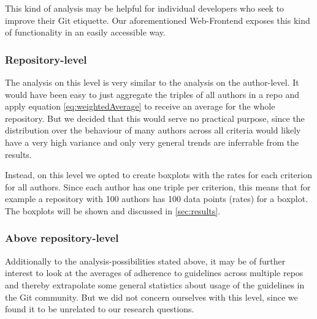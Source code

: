 This kind of analysis may be helpful for individual developers who seek to improve their Git etiquette. Our aforementioned Web-Frontend exposes this kind of functionality in an easily accessible way.

\subsubsection{Repository-level}
The analysis on this level is very similar to the analysis on the author-level. It would have been easy to just aggregate the triples of all authors in a repo and apply equation \ref{eq:weightedAverage} to receive an average for the whole repository. But we decided that this would serve no practical purpose, since the distribution over the behaviour of many authors across all criteria would likely have a very high variance and only very general trends are inferrable from the results.

Instead, on this level we opted to create boxplots with the rates for each criterion for all authors. Since each author has one triple per criterion, this means that for example a repository with 100 authors has 100 data points (rates) for a boxplot. The boxplots will be shown and discussed in \ref{sec:results}.

\subsubsection{Above repository-level}
Additionally to the analysis-possibilities stated above, it may be of further interest to look at the averages of adherence to guidelines across multiple repos and thereby extrapolate some general statistics about usage of the guidelines in the Git community. But we did not concern ourselves with this level, since we found it to be unrelated to our research questions.

